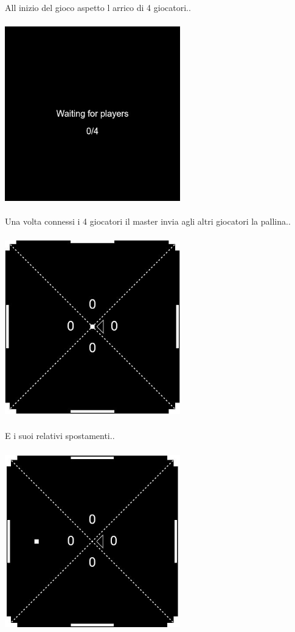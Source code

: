 \documentclass[11pt, a4paper, titlepage, block]{article}
\begin{document}
All inizio del gioco aspetto l arrico di 4 giocatori..\\\\
\includegraphics[width=3in,height=3in,viewport=0 0 300 300]{./Screenshots/Capture1.jpg}
\\
\\
Una volta connessi i 4 giocatori il master invia agli altri giocatori la pallina..\\\\
\includegraphics[width=3in,height=3in,viewport=0 0 300 300]{./Screenshots/Capture2.jpg}
\\
\\
E i suoi relativi spostamenti.. \\\\
\includegraphics[width=3in,height=3in,viewport=0 0 300 300]{./Screenshots/Capture3.jpg}
\end{document}
